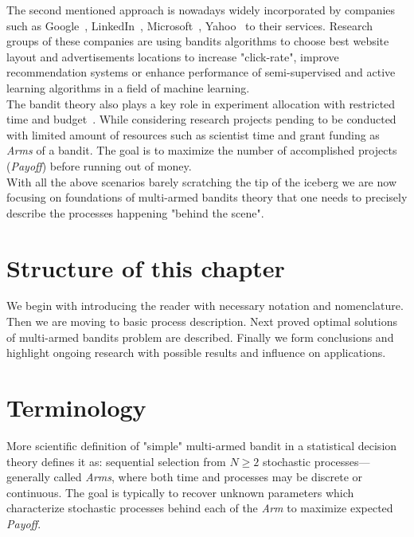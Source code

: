 \documentclass[12pt, a4paper, pdflatex, leqno]{report}
\begin{document}
The second mentioned approach is nowadays widely incorporated by companies such as Google~\citep{AYPSze12}\citep{ASMB:ASMB874}, LinkedIn~\citep{Tang:2013:AAF:2505515.2514700}, Microsoft~\citep{graepel2010web}, Yahoo~\citep{Li:2010:CAP:1772690.1772758} to their services. Research groups of these companies are using bandits algorithms to choose best website layout and advertisements locations to increase "click-rate", improve recommendation systems or enhance performance of semi-supervised and active learning algorithms in a field of machine learning.\\

The bandit theory also plays a key role in experiment allocation with restricted time and budget~\citep{gittins+glazebrook+weber}. While considering research projects pending to be conducted with limited amount of resources such as scientist time and grant funding as \emph{Arms} of a bandit. The goal is to maximize the number of accomplished projects (\emph{Payoff}) before running out of money.\\

With all the above scenarios barely scratching the tip of the iceberg we are now focusing on foundations of multi-armed bandits theory that one needs to precisely describe the processes happening "behind the scene".

\section{Structure of this chapter}
We begin with introducing the reader with necessary notation and nomenclature. Then we are moving to basic process description. Next proved optimal solutions of multi-armed bandits problem are described. Finally we form conclusions and highlight ongoing research with possible results and influence on applications.


\section{Terminology}
More scientific definition of "simple" multi-armed bandit in a statistical decision theory defines it as: sequential selection from $N \geq 2$ stochastic processes--- generally called \emph{Arms}, where both time and processes may be discrete or continuous. The goal is typically to recover unknown parameters which characterize stochastic processes behind each of the \emph{Arm} to maximize expected \emph{Payoff}.
\end{document}
